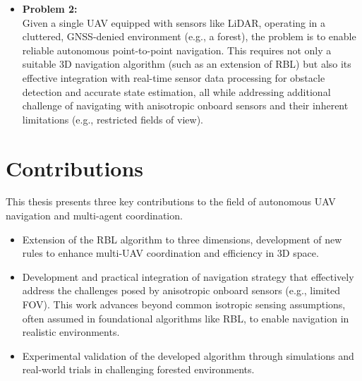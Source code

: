 \begin{enumerate}
      \begin{itemize}
        \item \textbf{Problem 2: } \\
        Given a single \ac{UAV} equipped with sensors like \ac{LiDAR}, operating in a cluttered, \ac{GNSS}-denied environment (e.g., a forest), the problem is to enable reliable autonomous point-to-point navigation. 
        This requires not only a suitable 3D navigation algorithm (such as an extension of \ac{RBL}) but also its effective integration with real-time sensor data processing for obstacle detection and accurate state estimation, all while addressing additional challenge of navigating with anisotropic onboard sensors and their inherent limitations (e.g., restricted fields of view).
      \end{itemize}
  \end{enumerate}

\section{Contributions}
  This thesis presents three key contributions to the field of autonomous \ac{UAV} navigation and multi-agent coordination.
  \begin{itemize}
    \item Extension of the \ac{RBL} algorithm to three dimensions, development of new rules to enhance multi-\ac{UAV} coordination and efficiency in 3D space.
    \item Development and practical integration of navigation strategy that effectively address the challenges posed by anisotropic onboard sensors (e.g., limited \ac{FOV}). 
    This work advances beyond common isotropic sensing assumptions, often assumed in foundational algorithms like \ac{RBL}, to enable navigation in realistic environments.
    \item Experimental validation of the developed algorithm through simulations and real-world trials in challenging forested environments.
  \end{itemize}

